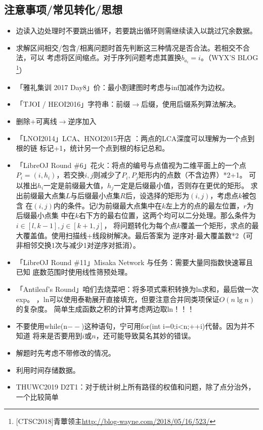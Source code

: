\subsection{注意事项/常见转化/思想}
\begin{itemize}
	\item 边读入边处理时不要跳出循环，若要跳出循环则需继续读入以跳过冗余数据。
	\item 求解区间相交/包含/相离问题时首先判断这三种情况是否合法。若相交不合法，可以
	      考虑将区间缩点。对于序列问题考虑其置换$b_{a_i}=i$。（WYX'S BLOG
	      \footnote{[CTSC2018]青蕈领主\url{http://blog-wayne.com/2018/05/16/523/}}）
	\item 「雅礼集训 2017 Day8」价：最小割建图时考虑与inf加减作为边权。
	\item 「TJOI / HEOI2016」字符串：前缀$\rightarrow$后缀，使用后缀系列算法解决。
	\item 删除+可离线$\rightarrow$逆序加入
	\item 「LNOI2014」LCA、HNOI2015开店 ：两点的LCA深度可以理解为一个点到根的链
	      标记+1，统计另一个点到根的标记总和。
	\item 「LibreOJ Round \#6」花火：将点的编号与点值视为二维平面上的一个点
	      $P_i=(i,h_i)$，若交换$i,j$则减少了$P_i,P_j$矩形内的点数（不含边界）*2+1。
	      可以推出$h_i$一定是前缀最大值，$h_j$一定是后缀最小值，否则存在更优的矩形。
	      求出前缀最大点集$L$与后缀最小点集$R$后，设选择的矩形为$(i,j)$，考虑点$k$被包含
	      在$(i,j)$内的条件。记$l$为前缀最大点集中在$k$左上方的点的最左位置，$r$为后缀最小点集
	      中在$k$右下方的最右位置，这两个均可以二分处理。那么条件为$i\in [l,k-1],j\in [k+1,j]$，
	      将问题转化为每个点$k$覆盖一个矩形，求点的最大覆盖值。使用扫描线+线段树解决。最后答案为
	      逆序对-最大覆盖数*2（可非相邻交换1次与减少1对逆序对抵消）。
	\item 「LibreOJ Round \#11」Misaka Network 与任务：需要大量同指数快速幂且已知
	      底数范围时使用线性筛预处理。
	\item 「Antileaf's Round」咱们去烧菜吧：将多项式乘积转换为ln求和，最后做一次exp。
		  ，ln可以使用泰勒展开直接填充，但要注意合并同类项保证$O(n\lg n)$的复杂度。
		  简单生成函数之积的计算考虑两边取ln！！！
	\item 不要使用while(n$--$)这种语句，宁可用for(int i=0;i<n;++i)代替。因为并不知道
	      将来是否要用到$i$或$n$，还可能导致莫名其妙的错误。
	\item 解题时先考虑不带修改的情况。
	\item 利用时间存储数据。
	\item THUWC2019 D2T1：对于统计树上所有路径的权值和问题，除了点分治外，一个比较简单

\end{itemize}
